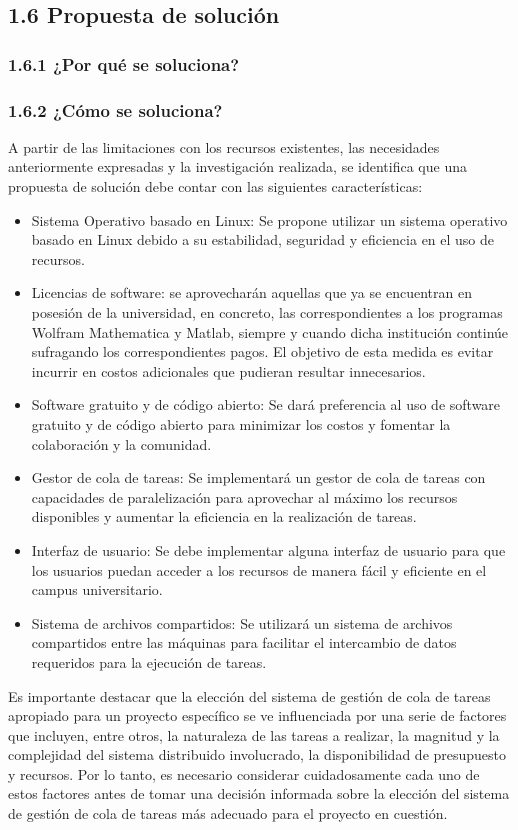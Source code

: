 \begin{doublespace}
\begin{multicols}{2}
  \subsection{1.6 Propuesta de solución}
  \subsubsection{1.6.1 ¿Por qué se soluciona?}
  \subsubsection{1.6.2 ¿Cómo se soluciona?}
  A partir de las limitaciones con los recursos existentes, las necesidades anteriormente expresadas y la investigación realizada, se identifica que una propuesta de solución debe contar con las siguientes características:
  \begin{itemize}
    \item Sistema Operativo basado en Linux: Se propone utilizar un sistema operativo basado en Linux debido a su estabilidad, seguridad y eficiencia en el uso de recursos.
    \item Licencias de software: se aprovecharán aquellas que ya se encuentran en posesión de la universidad, en concreto, las correspondientes a los programas Wolfram Mathematica y Matlab, siempre y cuando dicha institución continúe sufragando los correspondientes pagos. El objetivo de esta medida es evitar incurrir en costos adicionales que pudieran resultar innecesarios.
    \item Software gratuito y de código abierto: Se dará preferencia al uso de software gratuito y de código abierto para minimizar los costos y fomentar la colaboración y la comunidad.
    \item Gestor de cola de tareas: Se implementará un gestor de cola de tareas con capacidades de paralelización para aprovechar al máximo los recursos disponibles y aumentar la eficiencia en la realización de tareas.
    \item Interfaz de usuario: Se debe implementar alguna interfaz de usuario para que los usuarios puedan acceder a los recursos de manera fácil y eficiente en el campus universitario.
    \item Sistema de archivos compartidos: Se utilizará un sistema de archivos compartidos entre las máquinas para facilitar el intercambio de datos requeridos para la ejecución de tareas.
    \end{itemize} 
    Es importante destacar que la elección del sistema de gestión de cola de tareas apropiado para un proyecto específico se ve influenciada por una serie de factores que incluyen, entre otros, la naturaleza de las tareas a realizar, la magnitud y la complejidad del sistema distribuido involucrado, la disponibilidad de presupuesto y recursos. Por lo tanto, es necesario considerar cuidadosamente cada uno de estos factores antes de tomar una decisión informada sobre la elección del sistema de gestión de cola de tareas más adecuado para el proyecto en cuestión.


\end{multicols}
\end{doublespace}
